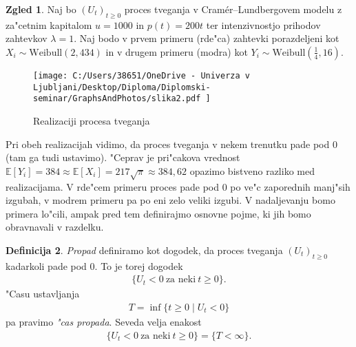 \documentclass[12pt, a4paper, reqno]{amsart}
\theoremstyle{definition}
\newtheorem{definicija}{Definicija}[section]
\newtheorem{zgled}[definicija]{Zgled}
\theoremstyle{plain}
\newcommand{\E}{\mathbb{E}}
\newcommand{\1}{\mathds{1}}
\begin{document}
        \begin{zgled}
            Naj bo $(U_t)_{t\geq0}$ proces tveganja v Cramér--Lundbergovem modelu z za"cetnim kapitalom
            $u = 1000$ in $p(t) = 200t$ ter intenzivnostjo prihodov zahtevkov $\lambda=1$. %
            Naj bodo v prvem primeru (rde"ca) 
            zahtevki porazdeljeni kot $X_i \sim \text{Weibull}(2, 434)$ in v drugem primeru (modra) kot
            $Y_i \sim \text{Weibull}(\tfrac{1}{4}, 16)$.
            
            \begin{figure}[H]
                \centering
                \texttt{[image: 
                    C:/Users/38651/OneDrive - Univerza v Ljubljani/Desktop/Diploma/Diplomski-seminar/GraphsAndPhotos/slika2.pdf
                    ]}
                \caption{Realizaciji procesa tveganja}
                \label{fig:slika3}
            \end{figure}

            \noindent
            Pri obeh realizacijah vidimo, da proces tveganja v nekem trenutku pade pod $0$ (tam ga 
            tudi ustavimo). "Ceprav je pri"cakova vrednost 
            $\E\left[Y_i\right] = 384 \approx \E\left[X_i\right] = 217\sqrt{\pi} \approx 384{,}62$ 
            opazimo bistveno razliko med realizacijama. V rde"cem primeru proces pade pod
            $0$ po ve"c zaporednih manj"sih izgubah, v modrem primeru pa po eni zelo veliki izgubi. 
            V nadaljevanju bomo primera lo"cili, ampak pred tem 
            definirajmo osnovne pojme, ki jih bomo obravnavali v razdelku.

            \label{zgd:weibullProcesTveganja}
        \end{zgled}

        \begin{definicija}
            \textit{Propad} definiramo kot dogodek, da proces tveganja $(U_t)_{t\geq0}$ kadarkoli pade pod $0$. 
            To je torej dogodek 
            \begin{align*}
                \bigl\{U_t<0 \ \text{za neki} \ t\geq 0\bigr\}.
            \end{align*}
            "Casu ustavljanja
            \begin{align*}
                T = \inf\{t\geq0 \mid U_t < 0\}
            \end{align*}
            pa pravimo \textit{"cas propada}. Seveda velja enakost
            \begin{align*}
                \{U_t<0 \ \text{za neki} \ t\geq0\} = \{T<\infty\}.
            \end{align*}
            \label{def:PropadCasPropada} 
        \end{definicija}
\end{document}
